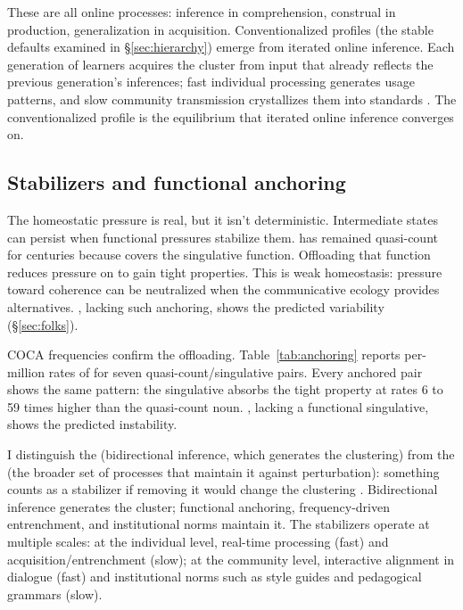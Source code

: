 \documentclass[12pt,a4paper]{article}
\begin{document}
These are all online processes: inference in comprehension, construal in production, generalization in acquisition. Conventionalized profiles (the stable defaults examined in \S\ref{sec:hierarchy}) emerge from iterated online inference. Each generation of learners acquires the cluster from input that already reflects the previous generation's inferences; fast individual processing generates usage patterns, and slow community transmission crystallizes them into standards \citep{kirby2008,strogatz2015}. The conventionalized profile is the equilibrium that iterated online inference converges on.

\subsection{Stabilizers and functional anchoring}

The homeostatic pressure is real, but it isn't deterministic. Intermediate states can persist when functional pressures stabilize them.  has remained quasi-count for centuries because  covers the singulative function. Offloading that function reduces pressure on  to gain tight properties. This is weak homeostasis: pressure toward coherence can be neutralized when the communicative ecology provides alternatives. , lacking such anchoring, shows the predicted variability (\S\ref{sec:folks}).

COCA frequencies confirm the offloading. Table~\ref{tab:anchoring} reports per-million rates of  for seven quasi-count/singulative pairs. Every anchored pair shows the same pattern: the singulative absorbs the tight property at rates 6 to 59 times higher than the quasi-count noun. , lacking a functional singulative, shows the predicted instability.



I distinguish the  (bidirectional inference, which generates the clustering) from the  (the broader set of processes that maintain it against perturbation): something counts as a stabilizer if removing it would change the clustering \citep{reynolds2025stack}. Bidirectional inference generates the cluster; functional anchoring, frequency-driven entrenchment, and institutional norms maintain it. The stabilizers operate at multiple scales: at the individual level, real-time processing (fast) and acquisition/entrenchment (slow); at the community level, interactive alignment in dialogue (fast) and institutional norms such as style guides and pedagogical grammars (slow).
\end{document}
